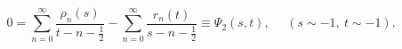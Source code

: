 \begin{equation}
0 = \sum_{n=0}^\infty
 \frac{\rho_n(s)}{t-n-\frac{1}{2}}-\sum_{n=0}^\infty
 \frac{r_n(t)}{s-n-\frac{1}{2}}
\equiv \Psi_2(s,t),\ \ \ \ \ \ (s \sim -1,\  t \sim -1).
\label{15}
\end{equation}

